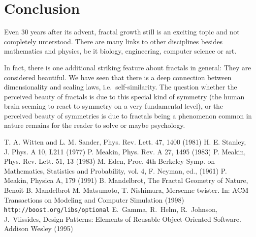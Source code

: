 \documentclass[twocolumn, 10pt]{scrartcl}
\begin{document}
    \section{Conclusion}
        Even 30 years after its advent, fractal growth still is an exciting topic and not completely unterstood.
        There are many links to other disciplines besides mathematics and physics, be it biology, engineering,
        computer science or art.

        In fact, there is one additional striking feature about fractals in general: They are considered beautiful. We
        have seen that there is a deep connection between dimensionality and scaling laws, i.e.\ self-similarity. The
        question whether the perceived beauty of fractals is due to this special kind of symmetry (the human brain
        seeming to react to symmetry on a very fundamental level), or the perceived beauty of symmetries is due to
        fractals being a phenomenon common in nature remains for the reader to solve or maybe psychology.

    \begin{thebibliography}{99}
         T. A. Witten and L. M. Sander, Phys. Rev. Lett. 47, 1400 (1981)
         H. E. Stanley, J. Phys. A 10, L211 (1977)
         P. Meakin, Phys. Rev. A 27, 1495 (1983)
         P. Meakin, Phys. Rev. Lett. 51, 13 (1983)
         M. Eden, Proc. 4th Berkeley Symp. on Mathematics, Statistics and Probability, vol. 4,
            F. Neyman, ed., (1961)
         P. Meakin, Physica A, 179 (1991)
         B. Mandelbrot, The Fractal Geometry of Nature, Benoit B. Mandelbrot
        M. Matsumoto, T. Nishimura, Mersenne twister. In: ACM Transactions on Modeling and
          Computer Simulation (1998)
         \texttt{http://boost.org/libs/optional}
         E.~Gamma, R.~Helm, R.~Johnson, J.~Vlissides,
          Design Patterns: Elements of Reusable Object-Oriented Software.
          Addison Wesley (1995)
    \end{thebibliography}
\end{document}
